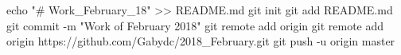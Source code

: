 echo "# Work_February_18" >> README.md
git init
git add README.md
git commit -m "Work of February 2018"
git remote add origin git remote add origin https://github.com/Gabydc/2018_February.git
git push -u origin master
